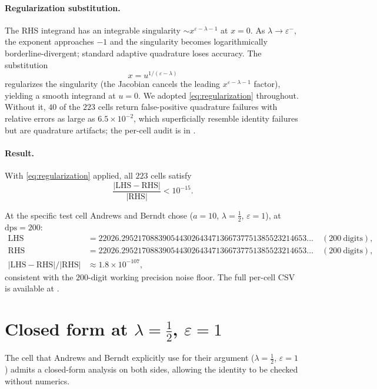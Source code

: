 \documentclass[11pt,reqno]{amsart}
\theoremstyle{definition}
\newcommand{\LHS}{\mathrm{LHS}}
\newcommand{\RHS}{\mathrm{RHS}}
\newcommand{\dps}{\mathrm{dps}}
\begin{document}
\paragraph{Regularization substitution.}
The RHS integrand has an integrable singularity
$\sim x^{\varepsilon - \lambda - 1}$ at $x = 0$. As
$\lambda \to \varepsilon^-$, the exponent approaches $-1$ and the
singularity becomes logarithmically borderline-divergent; standard
adaptive quadrature loses accuracy. The substitution
\begin{equation}\label{eq:regularization}
x = u^{1/(\varepsilon - \lambda)}
\end{equation}
regularizes the singularity (the Jacobian cancels the leading
$x^{\varepsilon - \lambda - 1}$ factor), yielding a smooth integrand
at $u = 0$. We adopted \cref{eq:regularization} throughout. Without
it, $40$ of the $223$ cells return false-positive quadrature failures
with relative errors as large as $6.5 \times 10^{-2}$, which
superficially resemble identity failures but are quadrature
artifacts; the per-cell audit is in
\cite[diary~57, \S3]{ProjectC}.

\paragraph{Result.}
With \cref{eq:regularization} applied, all $223$ cells satisfy
\[
\frac{\lvert \LHS - \RHS \rvert}{\lvert \RHS \rvert} < 10^{-15}.
\]

At the specific test cell Andrews and Berndt chose ($a = 10$,
$\lambda = \tfrac12$, $\varepsilon = 1$), at $\dps = 200$:
\begin{align*}
\LHS &= 22026.295217088390544302643471366737751385523214653\ldots
\quad (200~\text{digits}),\\
\RHS &= 22026.295217088390544302643471366737751385523214653\ldots
\quad (200~\text{digits}),\\
\lvert \LHS - \RHS \rvert / \lvert \RHS \rvert
&\approx 1.8 \times 10^{-107},
\end{align*}
consistent with the $200$-digit working precision noise floor. The
full per-cell CSV is available at \cite{ProjectC}.

\section{Closed form at $\lambda = \tfrac12$, $\varepsilon = 1$}\label{sec:closedform}

The cell that Andrews and Berndt explicitly use for their argument
($\lambda = \tfrac12$, $\varepsilon = 1$) admits a closed-form
analysis on both sides, allowing the identity to be checked without
numerics.
\end{document}
